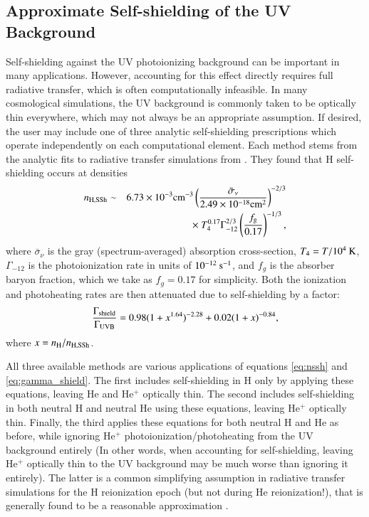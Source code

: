 \subsection{Approximate Self-shielding of the UV Background}
\label{section:UVB-self-shielding}
Self-shielding against the UV photoionizing background can be
important in many applications. However, accounting for this effect
directly requires full radiative transfer, which is often
computationally infeasible. In many cosmological simulations, the UV
background is commonly taken to be optically thin everywhere, which may not always be an appropriate assumption. If desired, the user may include one of three analytic self-shielding prescriptions which operate independently on each computational element. Each method stems from the analytic fits to radiative transfer simulations from \citet{2013MNRAS.430.2427R}. They found that H self-shielding occurs at densities
\begin{eqnarray} \label{eq:nssh}
n_{\rm{H,SSh}} & \sim & 6.73\times10^{-3} \rm{cm}^{-3} \left(\frac{\bar{\sigma}_{\nu}}{2.49\times10^{-18} \rm{cm}^{2}}\right)^{-2/3} \nonumber \\
 & & \times ~ T_{4}^{0.17} \Gamma_{-12}^{2/3} \left(\frac{f_{\rm{g}}}{0.17}\right)^{-1/3},
\end{eqnarray}
where $\bar{\sigma}_{\nu}$ is the gray (spectrum-averaged) absorption cross-section, $T_{4} = T / 10^{4} \: {\rm K}$, $\Gamma_{-12}$ is the photoionization rate in units of $10^{-12} \: {\rm s^{-1}}$, and $f_g$ is the absorber baryon fraction, which we take as $f_g = 0.17$ for simplicity. Both the ionization and photoheating rates are then attenuated due to self-shielding by a factor:
\begin{equation} \label{eq:gamma_shield}
\frac{\Gamma_{\rm{shield}}}{\Gamma_{\rm{UVB}}} = 0.98 (1 + x^{1.64})^{-2.28} + 0.02 (1 + x)^{-0.84},
\end{equation}
where $x = n_{\rm H} / n_{\rm H,SSh}$.

All three available methods are various applications of equations \ref{eq:nssh} and \ref{eq:gamma_shield}. The first includes self-shielding in H only by applying these equations, leaving He and He$^+$ optically thin. The second includes self-shielding in both neutral H and neutral He using these equations, leaving He$^+$ optically thin. Finally, the third applies these equations for both neutral H and He as before, while ignoring He$^+$ photoionization/photoheating from the UV background entirely (In other words, when accounting for self-shielding, leaving He$^+$ optically thin to the UV background may be much worse than ignoring it entirely). The latter is a common simplifying assumption in radiative transfer simulations for the H reionization epoch (but not during He reionization!), that is generally found to be a reasonable approximation \citep{2006agna.book.....O, 2010MNRAS.408.1945M, 2012MNRAS.421.2232F, 2013MNRAS.430.2427R}.  

